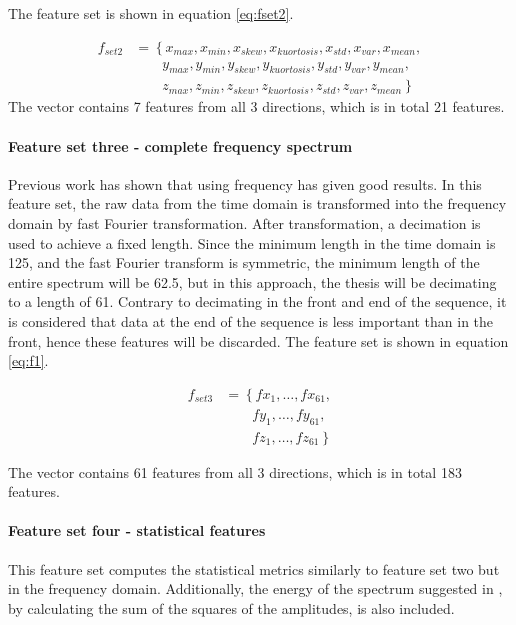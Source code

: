 \documentclass[USenglish]{ifimaster}  %
\begin{document}
The feature set is shown in equation \ref{eq:fset2}. 
	
\begin{align}\label{eq:fset2}
	f_{set2} &= \left\{x_{max},x_{min},x_{skew},x_{kuortosis},x_{std},x_{var},x_{mean}, \right.\nonumber\\
	&\qquad \left.{} y_{max},y_{min},y_{skew},y_{kuortosis},y_{std},y_{var},y_{mean}, \right.\nonumber\\
	&\qquad \left.{} z_{max},z_{min},z_{skew},z_{kuortosis},z_{std},z_{var},z_{mean} \right\}
\end{align}
The vector contains 7 features from all 3 directions, which is in total 21 features. 
	
\paragraph{Feature set three - complete frequency spectrum} 
Previous work has shown that using frequency has given good results. In this feature set, the raw data from the time domain is transformed into the frequency domain by fast Fourier transformation. After transformation, a decimation is used to achieve a fixed length. Since the minimum length in the time domain is 125, and the fast Fourier transform is symmetric, the minimum length of the entire spectrum will be 62.5, but in this approach, the thesis will be decimating to a length of 61. Contrary to decimating in the front and end of the sequence, it is considered that data at the end of the sequence is less important than in the front, hence these features will be discarded. The feature set is shown in equation \ref{eq:f1}.
	
\begin{align}\label{eq:f1}
f_{set3} &= \left\{fx_1,\dotsc,fx_{61}, \right.\nonumber\\
&\qquad \left.{} fy_1, \dotsc,fy_{61}, \right.\nonumber\\
&\qquad \left.{} fz_1,\dotsc,fz_{61}\right\}
\end{align}

The vector contains 61 features from all 3 directions, which is in total 183 features. 
	
\paragraph{Feature set four - statistical features} 
This feature set computes the statistical metrics similarly to feature set two but in the frequency domain. Additionally, the energy of the spectrum suggested in \cite{26b23e912c654fe4b7478fd910130195}, by calculating the sum of the squares of the amplitudes, is also included.
	
\end{document}

